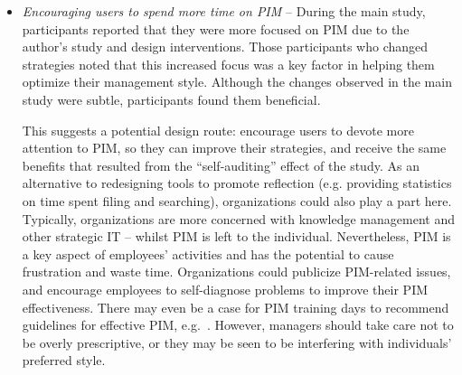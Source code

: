 \begin{itemize}

\item \textit{Encouraging users to spend more time on PIM} -- During the main study, participants reported that they were more focused on PIM due to the author's study and design interventions.  Those participants who changed strategies noted that this increased focus was a key factor in helping them optimize their management style. Although the changes observed in the main study were subtle, participants found them beneficial.  %

This suggests a potential design route: encourage users to devote more attention to PIM, so they can improve their strategies, and receive the same benefits that resulted from the ``self-auditing'' effect of the study.  As an alternative to redesigning tools to promote reflection (e.g. providing statistics on time spent filing and searching), organizations could also play a part here. Typically, organizations are more concerned with knowledge management and other strategic IT -- whilst PIM is left to the individual.  Nevertheless, PIM is a key aspect of employees' activities and has the potential to cause frustration and waste time.  Organizations could publicize PIM-related issues, and encourage employees to self-diagnose problems to improve their PIM effectiveness.  There may even be a case for PIM training days to recommend guidelines for effective PIM, e.g.~\citep{Allen:03}.  However, managers  should take care not to be overly prescriptive, or they may be seen to be interfering with individuals' preferred style. 



\end{itemize}
